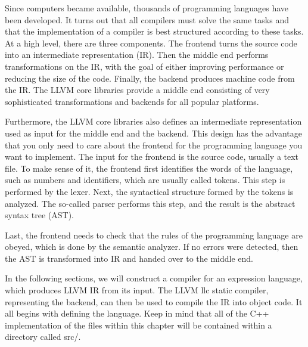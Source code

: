 Since computers became available, thousands of programming languages have been developed. It turns out that all compilers must solve the same tasks and that the implementation of a compiler is best structured according to these tasks. At a high level, there are three components. The frontend turns the source code into an intermediate representation (IR). Then the middle end performs transformations on the IR, with the goal of either improving performance or reducing the size of the code. Finally, the backend produces machine code from the IR. The LLVM core libraries provide a middle end consisting of very sophisticated transformations and backends for all popular platforms.

Furthermore, the LLVM core libraries also defines an intermediate representation used as input for the middle end and the backend. This design has the advantage that you only need to care about the frontend for the programming language you want to implement.
The input for the frontend is the source code, usually a text file. To make sense of it, the frontend first identifies the words of the language, such as numbers and identifiers, which are usually called tokens. This step is performed by the lexer. Next, the syntactical structure formed by the tokens is analyzed. The so-called parser performs this step, and the result is the abstract syntax tree (AST).

Last, the frontend needs to check that the rules of the programming language are obeyed, which is done by the semantic analyzer. If no errors were detected, then the AST is transformed into IR and handed over to the middle end.

In the following sections, we will construct a compiler for an expression language, which produces LLVM IR from its input. The LLVM llc static compiler, representing the backend, can then be used to compile the IR into object code. It all begins with defining the language. Keep in mind that all of the C++ implementation of the files within this chapter will be contained within a directory called src/.